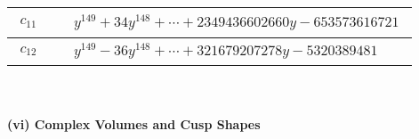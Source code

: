 \documentclass[1p]{elsarticle_modified}
\theoremstyle{definition}
\begin{document}
\begin{tabular}{m{50pt}|m{274pt}}
\hline $$\begin{aligned}c_{11}\end{aligned}$$&$\begin{aligned}
&y^{149}+34 y^{148}+\cdots+2349436602660 y-653573616721
\end{aligned}$\\
\hline $$\begin{aligned}c_{12}\end{aligned}$$&$\begin{aligned}
&y^{149}-36 y^{148}+\cdots+321679207278 y-5320389481
\end{aligned}$\\
\hline
\end{tabular}\\~\\
\newpage\flushleft \textbf{(vi) Complex Volumes and Cusp Shapes}
\end{document}
